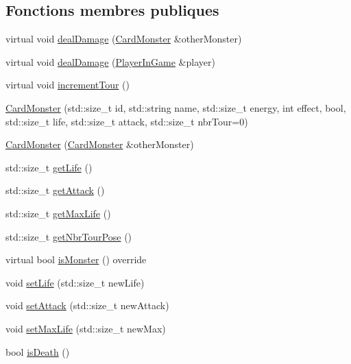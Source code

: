 \subsection*{Fonctions membres publiques}
\begin{DoxyCompactItemize}
\item 
virtual void \hyperlink{classCardMonster_aaf28396b394a9400d257eddfa09e4567}{deal\+Damage} (\hyperlink{classCardMonster}{Card\+Monster} \&other\+Monster)
\item 
virtual void \hyperlink{classCardMonster_a829d68246c3af5f136cdf2cbc11284b0}{deal\+Damage} (\hyperlink{classPlayerInGame}{Player\+In\+Game} \&player)
\item 
virtual void \hyperlink{classCardMonster_a2d55cf30d111437486e2b1bacefcbf79}{increment\+Tour} ()
\item 
\hyperlink{classCardMonster_a0a48a188d85c6e95a109638be09ddbca}{Card\+Monster} (std\+::size\+\_\+t id, std\+::string name, std\+::size\+\_\+t energy, int effect, bool, std\+::size\+\_\+t life, std\+::size\+\_\+t attack, std\+::size\+\_\+t nbr\+Tour=0)
\item 
\hyperlink{classCardMonster_a5f577cbecdf0d1c6a6ccbc848793ddef}{Card\+Monster} (\hyperlink{classCardMonster}{Card\+Monster} \&other\+Monster)
\item 
std\+::size\+\_\+t \hyperlink{classCardMonster_a01f20967b3b350e8430c30396c8cd0c9}{get\+Life} ()
\item 
std\+::size\+\_\+t \hyperlink{classCardMonster_a38fd3549de7e606f73e836ba98ed4f24}{get\+Attack} ()
\item 
std\+::size\+\_\+t \hyperlink{classCardMonster_a0e963cc2c613826e28891f00a9787e58}{get\+Max\+Life} ()
\item 
std\+::size\+\_\+t \hyperlink{classCardMonster_a8f3fd5d1e30a520aaa0c282bd84aa5d5}{get\+Nbr\+Tour\+Pose} ()
\item 
virtual bool \hyperlink{classCardMonster_add70449c1bc34baee852fe07cc7d39cc}{is\+Monster} () override
\item 
void \hyperlink{classCardMonster_aa70aa05b038da703524b82df5608734b}{set\+Life} (std\+::size\+\_\+t new\+Life)
\item 
void \hyperlink{classCardMonster_a358474586372d6b2b83301cceae34347}{set\+Attack} (std\+::size\+\_\+t new\+Attack)
\item 
void \hyperlink{classCardMonster_a9860956677866c7adbcda61c9951dd35}{set\+Max\+Life} (std\+::size\+\_\+t new\+Max)
\item 
bool \hyperlink{classCardMonster_a53aedfc1c1b823c775f3437685428d70}{is\+Death} ()
\end{DoxyCompactItemize}


